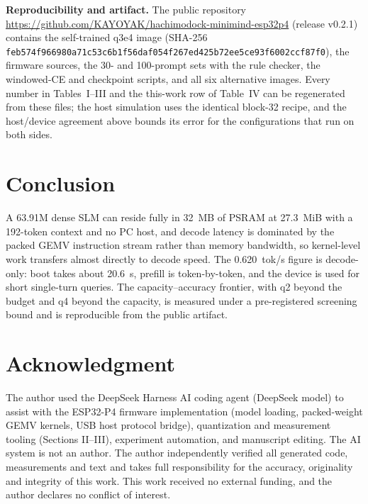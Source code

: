 \documentclass[journal,letterpaper]{IEEEtran}
\begin{document}
\textbf{Reproducibility and artifact.} The public repository
\url{https://github.com/KAYOYAK/hachimodock-minimind-esp32p4} (release v0.2.1) contains the
self-trained q3e4 image (SHA-256
\texttt{feb574f966980a71c53c6b1f56daf054f}\allowbreak\texttt{267ed425b72ee5ce93f6002ccf87f0}), the firmware
sources, the 30- and 100-prompt sets with the rule checker, the windowed-CE and checkpoint
scripts, and all six alternative images. Every number in Tables~I--III and the this-work row of
Table~IV can be regenerated from these files; the host simulation uses the identical block-32
recipe, and the host/device agreement above bounds its error for the configurations that run on
both sides.

\section{Conclusion}
A 63.91M dense SLM can reside fully in 32~MB of PSRAM at 27.3~MiB with a 192-token context and
no PC host, and decode latency is dominated by the packed GEMV instruction stream rather than
memory bandwidth, so kernel-level work transfers almost directly to decode speed. The
0.620~tok/s figure is decode-only: boot takes about 20.6~s, prefill is token-by-token, and the
device is used for short single-turn queries. The capacity--accuracy frontier, with q2 beyond
the budget and q4 beyond the capacity, is measured under a pre-registered screening bound and is
reproducible from the public artifact.

\section*{Acknowledgment}
The author used the DeepSeek Harness AI coding agent (DeepSeek model) to assist with the
ESP32-P4 firmware implementation (model loading, packed-weight GEMV kernels, USB host protocol
bridge), quantization and measurement tooling (Sections II--III), experiment automation, and
manuscript editing. The AI system is not an author. The author independently verified all
generated code, measurements and text and takes full responsibility for the accuracy,
originality and integrity of this work. This work received no external funding, and the author
declares no conflict of interest.
\end{document}
